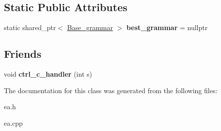 \subsection*{Static Public Attributes}
\begin{DoxyCompactItemize}
\item 
\mbox{\label{classEa_a5c190039c7096f5d8ce54f044765f922}} 
static shared\+\_\+ptr$<$ \mbox{\hyperlink{classBase__grammar}{Base\+\_\+grammar}} $>$ {\bfseries best\+\_\+grammar} = nullptr
\end{DoxyCompactItemize}
\subsection*{Friends}
\begin{DoxyCompactItemize}
\item 
\mbox{\label{classEa_a35f9ea2056a80a6c96b5c3ef3c19dafd}} 
void {\bfseries ctrl\+\_\+c\+\_\+handler} (int s)
\end{DoxyCompactItemize}


The documentation for this class was generated from the following files\+:\begin{DoxyCompactItemize}
\item 
ea.\+h\item 
ea.\+cpp\end{DoxyCompactItemize}
